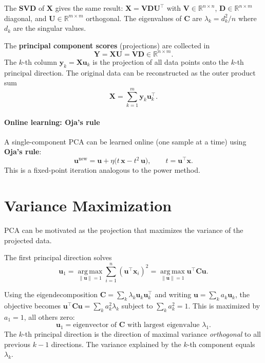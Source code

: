 \documentclass[11pt, oneside]{book}
\newcommand{\R}{\mathbb{R}}
\newcommand{\argmax}{\operatorname*{arg\,max}}
\newcommand{\T}{^{\top}}
\begin{document}
The \textbf{SVD} of $\bm{X}$ gives the same result: $\bm{X} = \bm{V}\bm{D}\bm{U}\T$
with $\bm{V} \in \R^{n \times n}$, $\bm{D} \in \R^{n \times m}$ diagonal, and
$\bm{U} \in \R^{m \times m}$ orthogonal.
The eigenvalues of $\bm{C}$ are $\lambda_k = d_k^2/n$ where $d_k$ are the singular values.

\begin{defbox}[title={PCA Projection}]
The \textbf{principal component scores} (projections) are collected in
\[
  \bm{Y} = \bm{X}\bm{U} = \bm{V}\bm{D} \in \R^{n \times m}.
\]
The $k$-th column $\bm{y}_k = \bm{X}\bm{u}_k$ is the projection of all data points
onto the $k$-th principal direction.
The original data can be reconstructed as the outer product sum
\[
  \bm{X} = \sum_{k=1}^{m} \bm{y}_k \bm{u}_k\T.
\]
\end{defbox}

\paragraph{Online learning: Oja's rule}
A single-component PCA can be learned online (one sample at a time) using
\textbf{Oja's rule}:
\[
  \bm{u}^{\mathrm{new}} = \bm{u} + \eta\bigl(t\,\bm{x} - t^2\,\bm{u}\bigr),
  \qquad t = \bm{u}\T\bm{x}.
\]
This is a fixed-point iteration analogous to the power method.


\section{Variance Maximization}

PCA can be motivated as the projection that maximizes the variance of the projected data.

The first principal direction solves
\[
  \bm{u}_1 = \argmax_{\|\bm{u}\|=1} \sum_{i=1}^{n}(\bm{u}\T\bm{x}_i)^2
  = \argmax_{\|\bm{u}\|=1} \bm{u}\T\bm{C}\bm{u}.
\]

\begin{thmbox}[title={Variance Maximization Solution}]
Using the eigendecomposition $\bm{C} = \sum_k \lambda_k \bm{u}_k\bm{u}_k\T$ and writing
$\bm{u} = \sum_k a_k \bm{u}_k$, the objective becomes
$\bm{u}\T\bm{C}\bm{u} = \sum_k a_k^2 \lambda_k$ subject to $\sum_k a_k^2 = 1$.
This is maximized by $a_1 = 1$, all others zero:
\[
  \bm{u}_1 = \text{eigenvector of } \bm{C} \text{ with largest eigenvalue } \lambda_1.
\]
The $k$-th principal direction is the direction of maximal variance \emph{orthogonal} to
all previous $k-1$ directions.
The variance explained by the $k$-th component equals $\lambda_k$.
\end{thmbox}
\end{document}

